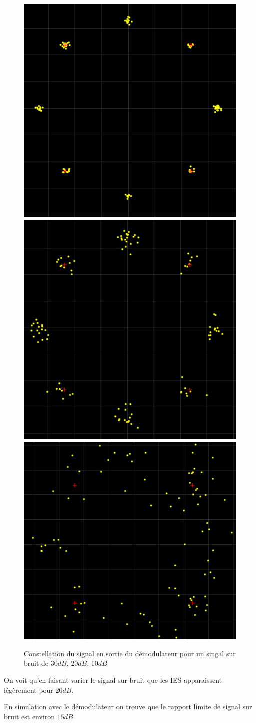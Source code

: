 \documentclass[11pt, openright]{book}
\begin{document}
\begin{figure}[ht!]
	\includegraphics[height=0.25\textwidth]{./object/c6.png}
	\includegraphics[height=0.25\textwidth]{./object/c4.png}
	\includegraphics[height=0.25\textwidth]{./object/c5.png}
	\caption{Constellation du signal en sortie du démodulateur pour un singal sur bruit de $30dB$, $20dB$, $10dB$}
\end{figure}

On voit qu'en faisant varier le signal sur bruit que les IES apparaissent légèrement pour $20dB$.

En simulation avec le démodulateur on trouve que le rapport limite de signal sur bruit est environ $15dB$
\end{document}
